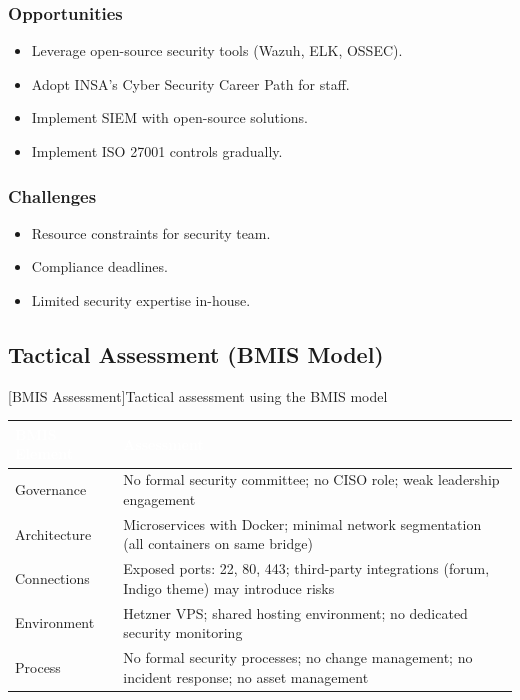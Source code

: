 \subsubsection{Opportunities}
\begin{itemize}
    \item Leverage open-source security tools (Wazuh, ELK, OSSEC).
    \item Adopt INSA's Cyber Security Career Path for staff.
    \item Implement SIEM with open-source solutions.
    \item Implement ISO 27001 controls gradually.
\end{itemize}

\subsubsection{Challenges}
\begin{itemize}
    \item Resource constraints for security team.
    \item Compliance deadlines.
    \item Limited security expertise in-house.
\end{itemize}

\subsection{Tactical Assessment (BMIS Model)}
\begin{center}
[BMIS Assessment]{Tactical assessment using the BMIS model}
\label{tab:bmis}
\begin{tabularx}{\textwidth}{|l|X|}
\hline
\rowcolor{mooveblue}
\textcolor{white}{\textbf{BMIS Element}} & \textcolor{white}{\textbf{Assessment}} \\
\hline
Governance & No formal security committee; no CISO role; weak leadership engagement \\
Architecture & Microservices with Docker; minimal network segmentation (all containers on same bridge) \\
Connections & Exposed ports: 22, 80, 443; third-party integrations (forum, Indigo theme) may introduce risks \\
Environment & Hetzner VPS; shared hosting environment; no dedicated security monitoring \\
Process & No formal security processes; no change management; no incident response; no asset management \\
\hline
\end{tabularx}
\end{center}


